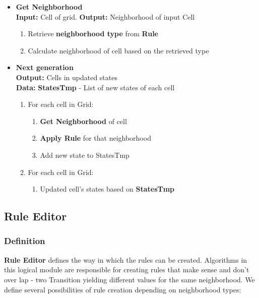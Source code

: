 \documentclass{article}
\begin{document}
\begin{itemize}

	\item {\bf Get Neighborhood} \\
	{\bf Input:} Cell of grid. 
	{\bf Output:} Neighborhood of input Cell
	
	\begin{enumerate}
		\item Retrieve {\bf neighborhood type} from {\bf Rule}
		\item Calculate neighborhood of cell based on the retrieved type  \\
	\end{enumerate}

	\item {\bf Next generation} \\
	{\bf Output:} Cells in updated states \\
	{\bf Data:} {\bf StatesTmp} - List of new states of each cell
	
	\begin{enumerate}
		\item For each cell in Grid:
			\begin{enumerate}
			\item {\bf Get Neighborhood} of cell
			\item {\bf Apply Rule} for that neighborhood
			\item Add new state to StatesTmp
			\end{enumerate}
		\item For each cell in Grid:
			\begin{enumerate}
			\item Updated cell's states based on {\bf StatesTmp}
			\end{enumerate}
	\end{enumerate}
\end{itemize}


\subsection{Rule Editor}

\subsubsection{Definition}
{\bf Rule Editor} defines the way in which the rules can be created.
Algorithms in this logical module are responsible for creating rules 
that make sense and don't over lap - two Transition yielding different values
for the same neighborhood. 
We define several possibilities of rule creation depending on neighborhood types:
\end{document}
